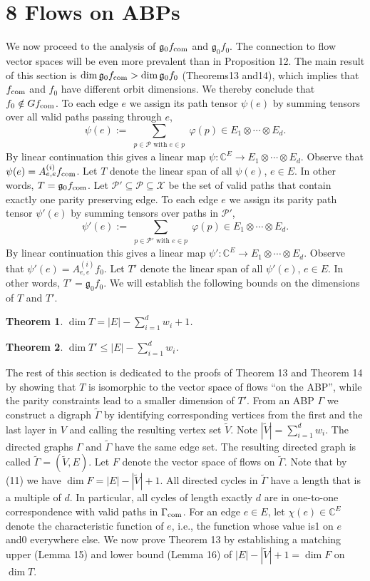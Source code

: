 \documentclass[10pt,a4paper]{article}
\newtheorem{theorem}{Theorem}
\newcommand{\C}{\mathbb C}
\newcommand{\fcom}{f_{\rm com}}
\newcommand{\Gcom}{\Gamma_{\rm com}}
\newcommand{\g}{\mathfrak g}
\begin{document}
\section*{8 Flows on ABPs}
We now proceed to the analysis of $\g_0\fcom$ and $\g_0f_0$. The connection to flow vector spaces will be even more prevalent than in Proposition 12. The main result of this section is $\dim\g_0\fcom>\dim\g_0f_0$ (Theorems13 and14), which implies that $\fcom$ and $f_0$ have different orbit dimensions. We thereby conclude that $f_0\notin G\fcom$.
To each edge $e$ we assign its path tensor $\psi(e)$ by summing tensors over all valid paths passing through $e$,
\[\psi(e):=\sum_{\substack{p\in\mathcal P\text{ with }e\in p}}\varphi(p)\in E_1\otimes\cdots\otimes E_d.\]
By linear continuation this gives a linear map $\psi:\C^E\to E_1\otimes\cdots\otimes E_d$. Observe that $\psi(e)=A^{(i)}_{e,e}\fcom$. Let $T$ denote the linear span of all $\psi(e)$, $e\in E$. In other words, $T=\g_0\fcom$.
Let $\mathcal P'\subseteq\mathcal P\subseteq\mathcal X$ be the set of valid paths that contain exactly one parity preserving edge. To each edge $e$ we assign its parity path tensor $\psi'(e)$ by summing tensors over paths in $\mathcal P'$,
\[\psi'(e):=\sum_{\substack{p\in\mathcal P'\text{ with }e\in p}}\varphi(p)\in E_1\otimes\cdots\otimes E_d.\]
By linear continuation this gives a linear map $\psi':\C^E\to E_1\otimes\cdots\otimes E_d$. Observe that $\psi'(e)=A^{(i)}_{e,e}f_0$. Let $T'$ denote the linear span of all $\psi'(e)$, $e\in E$. In other words, $T'=\g_0f_0$.
We will establish the following bounds on the dimensions of $T$ and $T'$.
\begin{theorem}$\dim T=|E|-\sum_{i=1}^d w_i+1$.\end{theorem}
\begin{theorem}$\dim T'\le|E|-\sum_{i=1}^d w_i$.\end{theorem}
The rest of this section is dedicated to the proofs of Theorem 13 and Theorem 14 by showing that $T$ is isomorphic to the vector space of flows ``on the ABP'', while the parity constraints lead to a smaller dimension of $T'$.
From an ABP $\Gamma$ we construct a digraph $\widetilde\Gamma$ by identifying corresponding vertices from the first and the last layer in $V$ and calling the resulting vertex set $\widetilde V$. Note $|\widetilde V|=\sum_{i=1}^d w_i$. The directed graphs $\Gamma$ and $\widetilde\Gamma$ have the same edge set. The resulting directed graph is called $\widetilde\Gamma=(\widetilde V,E)$. Let $F$ denote the vector space of flows on $\widetilde\Gamma$. Note that by (11) we have $\dim F=|E|-|\widetilde V|+1$. All directed cycles in $\widetilde\Gamma$ have a length that is a multiple of $d$. In particular, all cycles of length exactly $d$ are in one-to-one correspondence with valid paths in $\Gcom$. For an edge $e\in E$, let $\chi(e)\in\C^E$ denote the characteristic function of $e$, i.e., the function whose value is1 on $e$ and0 everywhere else.
We now prove Theorem 13 by establishing a matching upper (Lemma 15) and lower bound (Lemma 16) of $|E|-|\widetilde V|+1=\dim F$ on $\dim T$.
\end{document}
